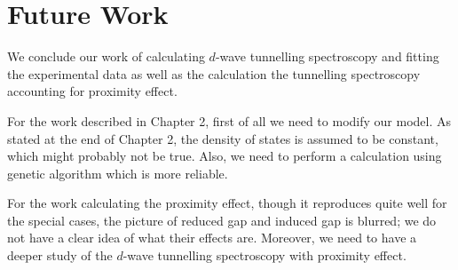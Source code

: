 
\chapter{Future Work} %
\label{Chapter4}
We conclude our work of calculating $d$-wave tunnelling spectroscopy and fitting the experimental data as well as the calculation the tunnelling spectroscopy accounting for proximity effect.

For the work described in Chapter 2, first of all we need to modify our model. As stated at the end of Chapter 2, the density of states is assumed to be constant, which might probably not be true. Also, we need to perform a calculation using genetic algorithm which is more reliable.

For the work calculating the proximity effect, though it reproduces quite well for the special cases, the picture of reduced gap and induced gap is blurred; we do not have a clear idea of what their effects are. Moreover, we need to have a deeper study of the $d$-wave tunnelling spectroscopy with proximity effect.

